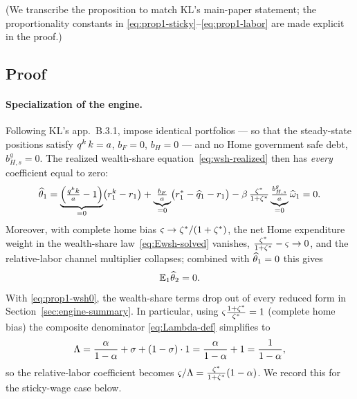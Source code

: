 \noindent (We transcribe the proposition to match KL's main-paper statement; the
proportionality constants in \eqref{eq:prop1-sticky}--\eqref{eq:prop1-labor} are
made explicit in the proof.)

\subsection{Proof}

\paragraph{Specialization of the engine.} Following KL's app.~B.3.1, impose
identical portfolios --- so that the steady-state positions satisfy
$q^{k}\,k=a$, $b_F=0$, $b_H=0$ --- and no Home government safe debt,
$b^g_{H,s}=0$. The realized wealth-share equation~\eqref{eq:wsh-realized} then
has \emph{every} coefficient equal to zero:
\[
\widehat{\theta}_1 = \underbrace{\Bigl(\tfrac{q^{k} k}{a}-1\Bigr)}_{=0}\bigl(r^{k}_1-r_1\bigr)
+\underbrace{\tfrac{b_F}{a}}_{=0}\bigl(r^{*}_1-\widehat{q}_1-r_1\bigr)
-\beta\,\tfrac{\zeta^{*}}{1+\zeta^{*}}\underbrace{\tfrac{b^g_{H,s}}{a}}_{=0}\widehat{\omega}_1
= 0.
\]
Moreover, with complete home bias $\varsigma\to\zeta^{*}/(1+\zeta^{*})$, the net Home
expenditure weight in the wealth-share law~\eqref{eq:Ewsh-solved} vanishes,
$\frac{\zeta^{*}}{1+\zeta^{*}}-\varsigma\to0$, and the relative-labor channel multiplier
collapses; combined with $\widehat{\theta}_1=0$ this gives
\begin{equation}
\mathbb{E}_1\widehat{\theta}_2 = 0. \label{eq:prop1-wsh0}
\end{equation}
With \eqref{eq:prop1-wsh0}, the wealth-share terms drop out of every reduced form
in Section~\ref{sec:engine-summary}. In particular, using
$\varsigma\frac{1+\zeta^{*}}{\zeta^{*}}=1$ (complete home bias) the composite denominator
\eqref{eq:Lambda-def} simplifies to
\begin{equation}
\Lambda = \frac{\alpha}{1-\alpha}+\sigma+(1-\sigma)\cdot1
=\frac{\alpha}{1-\alpha}+1 = \frac{1}{1-\alpha}, \label{eq:Lambda-cmplt}
\end{equation}
so the relative-labor coefficient becomes
$\varsigma/\Lambda=\frac{\zeta^{*}}{1+\zeta^{*}}(1-\alpha)$. We record this for the sticky-wage
case below.

